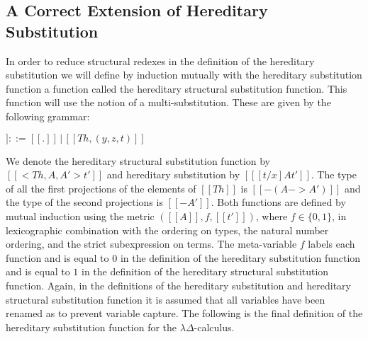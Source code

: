 \subsection{A Correct Extension of Hereditary Substitution}
\label{subsec:the_final_extension}
In order to reduce structural redexes in the definition of the
hereditary substitution we will define by induction mutually with
the hereditary substitution function  a function called the
hereditary structural substitution function.  This function will
use the notion of a multi-substitution.  These are
given by the following grammar:
\begin{center}
  \begin{math}
    [[Th]] ::= [[.]]\,|\,[[Th,(y,z,t)]]
  \end{math}
\end{center}
We denote the hereditary structural substitution function by $[[<Th ,
A, A'>t']]$ and hereditary substitution by $[[ [t/x] A t']]$.  The
type of all the first projections of the elements of $[[Th]]$ is
$[[{-(A->A')}]]$ and the type of the second projections is $[[{-A'}]]$.
Both functions are defined by mutual induction using the metric
$([[A]],f,[[t']])$, where $f \in \{0,1\}$, in lexicographic
combination with the ordering on types, the natural number ordering,
and the strict subexpression on terms.  The meta-variable $f$ labels
each function and is equal to $0$ in the definition of the hereditary
substitution function and is equal to $1$ in the definition of the
hereditary structural substitution function.  Again, in the definitions of
the hereditary substitution and hereditary structural substitution
function it is assumed that all variables have been renamed as to
prevent variable capture.  The following is the final definition of the
hereditary substitution function for the $\lambda\Delta$-calculus.

